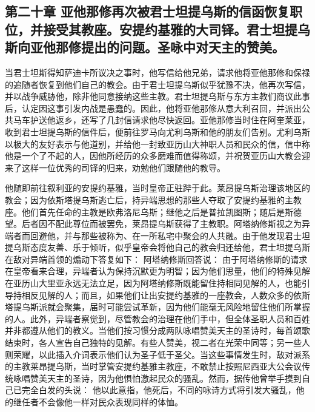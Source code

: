
\subsection{第二十章  亚他那修再次被君士坦提乌斯的信函恢复职位，并接受其教座。安提约基雅的大司铎。君士坦提乌斯向亚他那修提出的问题。圣咏中对天主的赞美。}

当君士坦斯得知萨迪卡所议决之事时，他写信给他兄弟，请求他将亚他那修和保禄的追随者恢复到他们自己的教会。由于君士坦提乌斯似乎犹豫不决，他再次写信，并以战争威胁他，除非他同意接纳这些主教。君士坦提乌斯与东方主教们商议此事后，认定因这事引发内战是愚蠢的。因此，他将亚他那修从意大利召回，并派出公共马车护送他返乡，还写了几封信请求他尽快返回。亚他那修当时住在阿奎莱亚，收到君士坦提乌斯的信件后，便前往罗马向尤利乌斯和他的朋友们告别。尤利乌斯以极大的友好表示与他道别，并给他一封致亚历山大神职人员和民众的信，信中称他是一个了不起的人，因他所经历的众多磨难而值得称颂，并祝贺亚历山大教会迎来了这样一位优秀的司铎的归来，劝勉他们跟随他的教导。\par

他随即前往叙利亚的安提约基雅，当时皇帝正驻跸于此。莱昂提乌斯治理该地区的教会；因为依斯塔提乌斯逃亡后，持异端思想的那些人夺取了安提约基雅的主教座。他们首先任命的主教是欧弗洛尼乌斯；继他之后是普拉凯图斯；随后是斯德望。后者因不配此尊位而被罢免，莱昂提乌斯获得了主教职。阿塔纳修斯视之为异端者而回避他，并与那些被称为、在一所私宅中聚会的人共融。由于他发现君士坦提乌斯态度友善、乐于倾听，似乎皇帝会将他自己的教会归还给他，君士坦提乌斯在敌对异端首领的煽动下答复如下： 阿塔纳修斯回答说： 由于阿塔纳修斯的请求在皇帝看来合理，异端者认为保持沉默更为明智；因为他们思量，他们的特殊见解在亚历山大里亚永远无法立足，因为阿塔纳修斯既能留住持相同见解的人，也能引导持相反见解的人；而且，如果他们让出安提约基雅的一座教会，人数众多的依斯塔提乌斯派就会聚集，届时可能尝试革新，因为他们能毫无风险地留住他们所掌握的人。此外，异端者察觉到，尽管教会的治理在他们手中，但全体圣职人员和百姓并非都遵从他们的教义。当他们按习惯分成两队咏唱赞美天主的圣诗时，每首颂歌结束时，各人宣告自己独特的见解。有些人赞美，视二者在光荣中同等；另一些人则荣耀，以此插入介词表示他们认为圣子低于圣父。当这些事情发生时，敌对派系的主教莱昂提乌斯，当时掌管安提约基雅主教座，不敢禁止按照尼西亚大公会议传统咏唱赞美天主的圣诗，因为他惧怕激起民众的骚乱。然而，据传他曾举手摸到自己已完全白发的头说： 他以此意指，他死后，不同的咏诗方式将引发大骚乱，他的继任者不会像他一样对民众表现同样的体恤。\par

